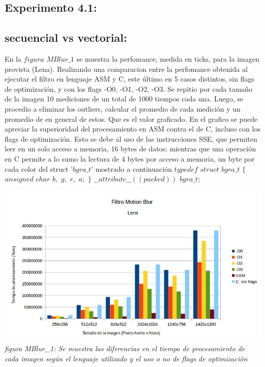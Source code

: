 \documentclass[a4paper]{article}
\begin{document}
\subsection{Experimento 4.1:}

\subsection{secuencial vs vectorial:}

En la $figura$ $MBlur\_1$ se muestra la perfomance, medida en ticks, para la imagen provista (Lena). Realizando una comparacion entre la perfomance obtenida al ejecutar el filtro en lenguaje ASM y C, este último en 5 casos distintos, sin flags de optimización, y con los flags -O0, -O1, -O2, -O3. Se repitio por cada tamaño de la imagen 10 mediciones de un total de 1000 tiempos cada una. Luego, se procedio a eliminar los outliers, calcular el promedio de cada medición y un promedio de en general de estos. Que es el valor graficado. En el grafico se puede apreciar la superioridad del procesamiento en ASM contra el de C, incluso con los flags de optimización.
Esto se debe al uso de las instrucciones SSE, que permiten leer
en un solo acceso a memoria, 16 bytes de datos; mientras que una operación en C permite a lo sumo la lectura de 4 bytes por acceso a memoria, un byte por cada color del struct $’bgra\_t’$ mostrado a continuación 
$typedef$ $struct$ $bgra\_t$ $\{$\newline
	$unsigned$ $char$ $b,$ $g,$ $r,$ $a;$ \newline
$\}$ $\_\_attribute\_\_((packed))$ $bgra\_t;$ \newline

\vspace{1cm}
\includegraphics[width=\textwidth,height=\textheight,keepaspectratio
]{mblur.jpg}
\textit{figura MBlur\_1: Se muestra las diferencias en el tiempo de procesamiento de cada imagen según el lenguaje utilizado y el uso o no de flags de optimización} \newline \newline
\end{document}
